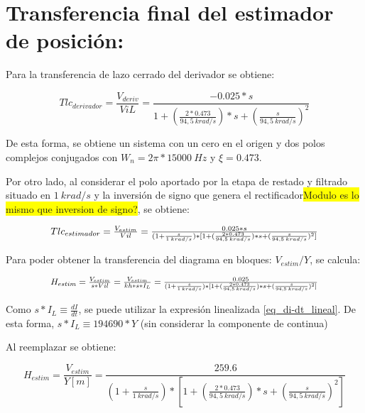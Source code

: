 \section{Transferencia final del estimador de posici\'{o}n:}

\noindent Para la transferencia de lazo cerrado del derivador se obtiene:

\begin{equation} \label{eq_TLC_deriv_1}
	{Tlc}_{derivador}=\frac{V_{deriv}}{ViL}=\frac{-0.025*s}{1+(\frac{2*0.473}{94,5\ krad/s})*s+(\frac{s}{94,5\ krad/s})^2}
\end{equation}

\noindent De esta forma, se obtiene un sistema con un cero en el origen y dos polos complejos conjugados con $W_n=2\pi *15000 \:Hz$ y  $\xi =0.473$.

\noindent Por otro lado, al considerar el polo aportado por la etapa de restado y filtrado situado en $1 \:{krad/s}$ y la inversi\'{o}n de signo que genera el rectificador\colorbox{yellow}{Modulo es lo mismo que inversion de signo?}, se obtiene:

\begin{equation} \label{eq_TLC_deriv_2}
	\resizebox{.8\hsize}{!}
	{
	$
	{Tlc}_{estimador}=\frac{V_{estim}}{Vil}=\frac{0.025*s}{(1+\frac{s}{1 \:{krad/s}})*[1+(\frac{2*0.473}{94,5 \:{krad/s}})*s+(\frac{s}{94,5 \:{krad/s}})^2]}
	$
	}
\end{equation}

\noindent Para poder obtener la transferencia del diagrama en bloques: $V_{estim}/Y$, se calcula:

\begin{equation} \label{eq_TLC_deriv_3}
	\resizebox{.8\hsize}{!}
	{
	$
	H_{estim}=\frac{V_{estim}}{s*Vil}=\frac{V_{estim}}{kh*s*I_L}=\frac{0.025}{(1+\frac{s}{1\: krad/s})*[1+(\frac{2*0.473}{94,5\: krad/s})*s+(\frac{s}{94,5\: krad/s})^2]}
	$
	}
\end{equation}

\noindent Como $s*I_L\equiv \frac{dI}{dt}$, se puede utilizar la expresi\'{o}n linealizada \ref{eq_di-dt_lineal}. De esta forma,  $s*I_L\equiv 194690*Y$ (sin considerar la componente de continua)

\noindent Al reemplazar se obtiene:

\begin{equation} \label{eq_TLC_deriv_5}
	H_{estim}=\frac{V_{estim}}{Y[m]}=\frac{259.6}{(1+\frac{s}{1\ krad/s})*[1+(\frac{2*0.473}{94,5\: krad/s})*s+(\frac{s}{94,5\: krad/s})^2]}
\end{equation}

